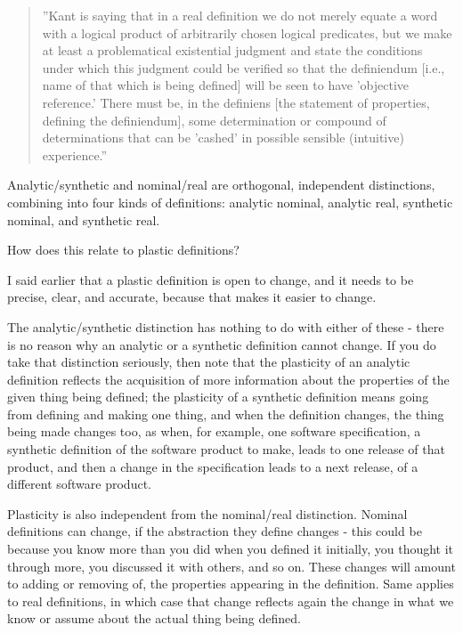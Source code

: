 \begin{quote}
''Kant is saying that in a real definition we do not merely equate a word with a logical product of arbitrarily chosen logical predicates, but we make at least a problematical existential judgment and state the conditions under which this judgment could be verified so that the definiendum [i.e., name of that which is being defined] will be seen to have 'objective reference.' There must be, in the definiens [the statement of properties, defining the definiendum], some determination or compound of determinations that can be 'cashed' in possible sensible (intuitive) experience.'' \cite{beck1956kant}
\end{quote}

Analytic/synthetic and nominal/real are orthogonal, independent distinctions, combining into four kinds of definitions: analytic nominal, analytic real, synthetic nominal, and synthetic real.

How does this relate to plastic definitions? 

I said earlier that a plastic definition is open to change, and it needs to be precise, clear, and accurate, because that makes it easier to change. 

The analytic/synthetic distinction has nothing to do with either of these - there is no reason why an analytic or a synthetic definition cannot change. If you do take that distinction seriously, then note that the plasticity of an analytic definition reflects the acquisition of more information about the properties of the given thing being defined; the plasticity of a synthetic definition means going from defining and making one thing, and when the definition changes, the thing being made changes too, as when, for example, one software specification, a synthetic definition of the software product to make, leads to one release of that product, and then a change in the specification leads to a next release, of a different software product. 

Plasticity is also independent from the nominal/real distinction. Nominal definitions can change, if the abstraction they define changes - this could be because you know more than you did when you defined it initially, you thought it through more, you discussed it with others, and so on. These changes will amount to adding or removing of, the properties appearing in the definition. Same applies to real definitions, in which case that change reflects again the change in what we know or assume about the actual thing being defined.

